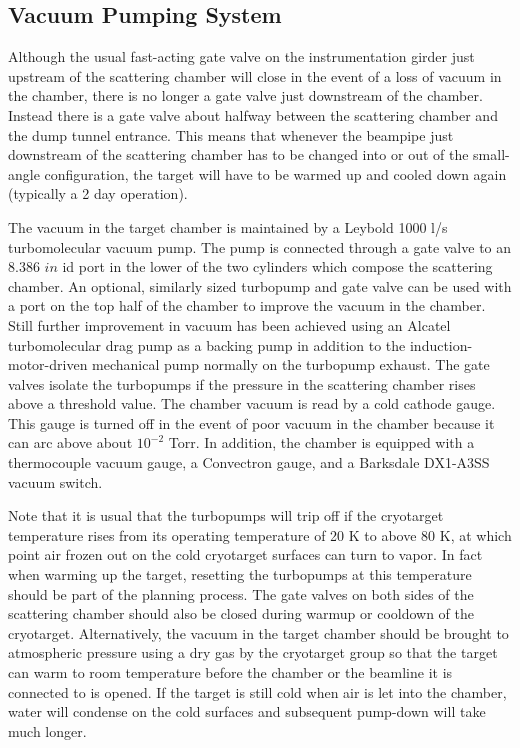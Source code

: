 {\subsection{Vacuum Pumping System}

Although the usual fast-acting gate valve on the instrumentation
girder just upstream of the scattering chamber will close in the event
of a loss of vacuum in the chamber, there is no longer a gate valve
just downstream of the chamber. Instead there is a gate valve about
halfway between the scattering chamber and the dump tunnel
entrance. This means that whenever the beampipe just downstream of the
scattering chamber has to be changed into or out of the small-angle
configuration, the target will have to be warmed up and cooled down
again (typically a 2 day operation).

The vacuum in the target chamber is maintained by a Leybold 1000 l/s
turbomolecular vacuum pump. The pump is connected through a gate valve
to an 8.386 $in$ id port in the lower of the two cylinders which
compose the scattering chamber. An optional, similarly sized turbopump
and gate valve can be used with a port on the top half of the chamber
to improve the vacuum in the chamber.  Still further improvement in
vacuum has been achieved using an Alcatel turbomolecular drag pump as
a backing pump in addition to the induction-motor-driven
mechanical pump normally on the turbopump exhaust. The gate valves isolate the turbopumps if the pressure in the scattering chamber rises above a threshold value. The chamber vacuum is read by a cold cathode gauge. This gauge is turned off in the event of poor vacuum in the chamber because it can arc above about $10^{-2}$ Torr. In addition, the chamber is equipped with a thermocouple vacuum gauge, a Convectron gauge, and a Barksdale DX1-A3SS vacuum switch.


Note that it is usual that the turbopumps will trip off if the
cryotarget temperature rises from its operating temperature of 20 K to
above 80 K, at which point air frozen out on the cold cryotarget
surfaces can turn to vapor. In fact when warming up the target,
resetting the turbopumps at this temperature should be part of the
planning process. The gate valves on both sides of the scattering
chamber should also be closed during warmup or cooldown of the
cryotarget. Alternatively, the vacuum in the target chamber should be
brought to atmospheric pressure using a dry gas by the cryotarget
group so that the target can warm to room temperature before the
chamber or the beamline it is connected to is opened. If the target is
still cold when air is let into the chamber, water will condense on
the cold surfaces and subsequent pump-down will take much longer.

}

